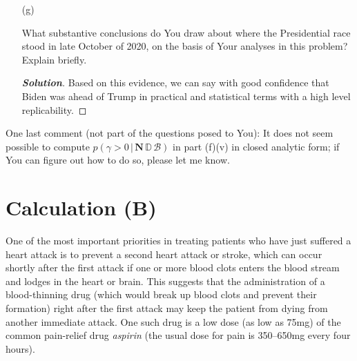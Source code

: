 \documentclass[12pt]{article}
\newcommand{\given}{\, | \,}
\newenvironment{solution}{\begin{tcolorbox}[breakable]\begin{proof}[\textbf{\textit{Solution}}] }{\end{proof}\end{tcolorbox}}
\begin{document}
\begin{itemize}
\begin{itemize}
\begin{itemize}
\end{itemize}

\item[(g)]

What substantive conclusions do You draw about where the Presidential race stood in late October of 2020, on the basis of Your analyses in this problem? Explain briefly. \textit{\fbox{\textbf{[5 points]}}}

\begin{solution}
    Based on this evidence, we can say with good confidence that Biden was ahead of Trump in practical and statistical terms with a high level replicability. 
\end{solution}

\end{itemize}

\end{itemize}

One last comment (not part of the questions posed to You): It does not seem possible to compute $p ( \gamma > 0 \given \bm{ N } \, \mathbb{ D } \, \mathcal{ B } )$ in part (f)(v) in closed analytic form; if You can figure out how to do so, please let me know.

\addtocounter{section}{-1}

\section{Calculation (B)}

 \vspace*{0.025in} One of the most important priorities in treating patients who have just suffered a heart attack is to prevent a second heart attack or stroke, which can occur shortly after the first attack if one or more blood clots enters the blood stream and lodges in the heart or brain. This suggests that the administration of a blood-thinning drug (which would break up blood clots and prevent their formation) right after the first attack may keep the patient from dying from another immediate attack. One such drug is a low dose (as low as 75mg) of the common pain-relief drug \textit{aspirin} (the usual dose for pain is 350--650mg every four hours). 
\end{document}
